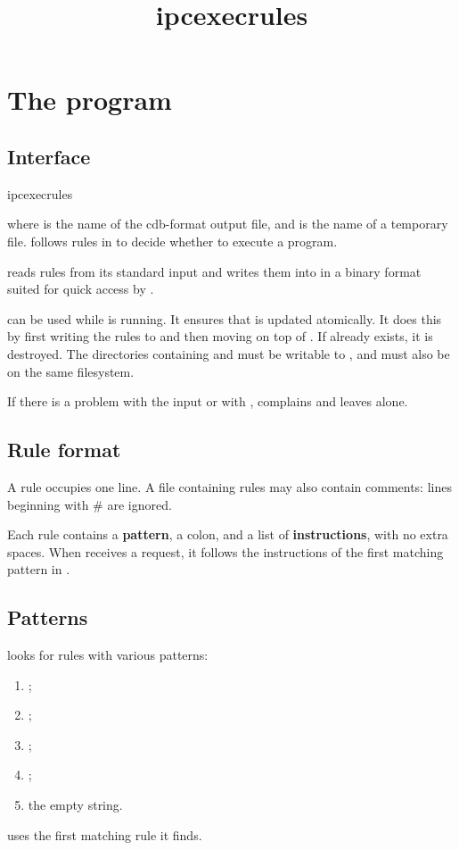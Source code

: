 \documentclass{book}
\title{ipcexecrules}
\begin{document}
\section{The  program}

\subsection{Interface}
\begin{code}%
  ipcexecrules  
\end{code}
where  is the name of the cdb-format output file, and
 is the name of a temporary file.
 follows rules in  to decide whether to
execute a program.

 reads rules from its standard input and writes them
into  in a binary format suited for quick access by
.

 can be used while  is running.  It
ensures that  is updated atomically.  It does this by first
writing the rules to  and then moving  on top of
.  If  already exists, it is destroyed.  The
directories containing  and  must be writable to
, and must also be on the same filesystem.

If there is a problem with the input or with , 
complains and leaves  alone.

\subsection{Rule format}
A rule occupies one line.  A file containing rules may also contain
comments: lines beginning with \# are ignored.

Each rule contains a \textbf{pattern}, a colon, and a list of
\textbf{instructions}, with no extra spaces.  When  receives a
request, it follows the instructions of the first matching pattern in
.

\subsection{Patterns}
 looks for rules with various patterns:
\begin{enumerate}
\item {};
\item {};
\item {};
\item {};
\item the empty string.
\end{enumerate}
 uses the first matching rule it finds.
\end{document}
